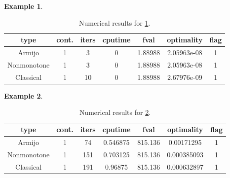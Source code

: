 \documentclass[a4paper]{article}
\newtheorem{example}{Example}
\newcommand{\mr}{\mathbb{R}}
\newcommand{\co}[1]{{\con{#1}}}
\begin{document}
  
  \begin{example}\label{exp6}
  \end{example}
  
  \begin{table}[p]
    \centering
    \begin{tabular}{cc|ccccc}
      \hline
      type & cont. & iters & cputime & 
      fval & optimality & flag \\ \hline
      Armijo & 1 & 3 & 0 & 1.88988 & 2.05963e-08 & 1 \\
      Nonmonotone & 1 & 3 & 0 & 1.88988 & 2.05963e-08 & 1 \\
      Classical & 1 & 10 & 0 & 1.88988 & 2.67976e-09 & 1 \\
      \hline
    \end{tabular}
    \caption{Numerical results for \cref{exp6}.}
    \label{tab6}
  \end{table}

\begin{example}\label{exp7}
\end{example}

\begin{table}[p]
  \centering
  \begin{tabular}{cc|ccccc}
    \hline
    type & cont. & iters & cputime & 
    fval & optimality & flag \\ \hline
    Armijo & 1 & 74 & 0.546875 & 815.136 & 0.00171295 & 1 \\
    Nonmonotone & 1 & 151 & 0.703125 & 815.136 & 0.000385093 & 1 \\
    Classical & 1 & 191 & 0.96875 & 815.136 & 0.000632897 & 1 \\
    \hline
  \end{tabular}
  \caption{Numerical results for \cref{exp7}.}
  \label{tab7}
\end{table}
  
\end{document}
